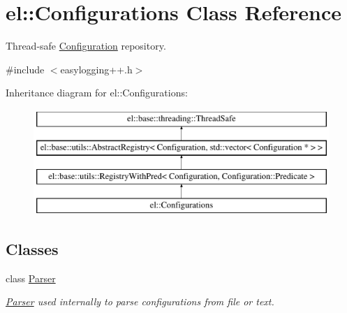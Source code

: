 \hypertarget{classel_1_1Configurations}{\section{el\-:\-:Configurations Class Reference}
\label{classel_1_1Configurations}
}


Thread-\/safe \hyperlink{classel_1_1Configuration}{Configuration} repository.  




{\ttfamily \#include $<$easylogging++.\-h$>$}

Inheritance diagram for el\-:\-:Configurations\-:\begin{figure}[H]
\begin{center}
\leavevmode
\includegraphics[height=4.000000cm]{classel_1_1Configurations}
\end{center}
\end{figure}
\subsection*{Classes}
\begin{DoxyCompactItemize}
\item 
class \hyperlink{classel_1_1Configurations_1_1Parser}{Parser}
\begin{DoxyCompactList}\small\item\em \hyperlink{classel_1_1Configurations_1_1Parser}{Parser} used internally to parse configurations from file or text. \end{DoxyCompactList}\end{DoxyCompactItemize}

